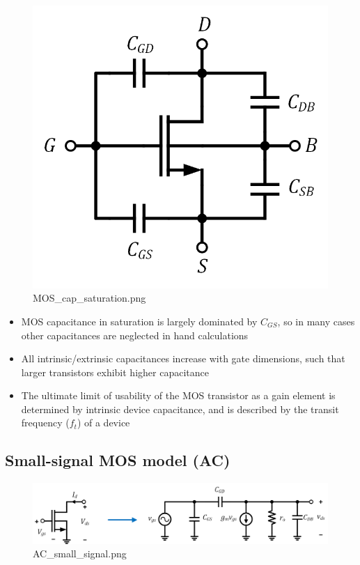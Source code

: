 \documentclass[11pt]{article}
\providecommand{\tightlist}{%
      \setlength{\itemsep}{0pt}\setlength{\parskip}{0pt}}
\begin{document}
    \begin{figure}
\centering
\includegraphics{MOS_cap_saturation.png}
\caption{MOS\_cap\_saturation.png}
\end{figure}

    \begin{itemize}
\tightlist
\item
  MOS capacitance in saturation is largely dominated by \(C_{GS}\), so
  in many cases other capacitances are neglected in hand calculations
\item
  All intrinsic/extrinsic capacitances increase with gate dimensions,
  such that larger transistors exhibit higher capacitance
\item
  The ultimate limit of usability of the MOS transistor as a gain
  element is determined by intrinsic device capacitance, and is
  described by the transit frequency (\(f_t\)) of a device
\end{itemize}

    \hypertarget{small-signal-mos-model-ac}{%
\subsection{Small-signal MOS model
(AC)}\label{small-signal-mos-model-ac}}

    \begin{figure}
\centering
\includegraphics{AC_small_signal.png}
\caption{AC\_small\_signal.png}
\end{figure}
\end{document}
